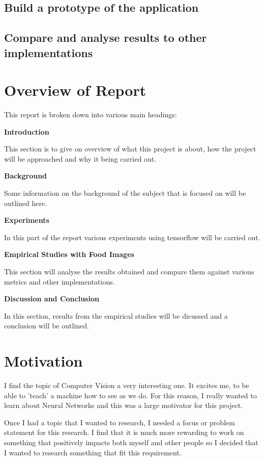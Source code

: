 \subsection*{Build a prototype of the application}

\subsection*{Compare and analyse results to other implementations}


\section{Overview of Report}

This report is broken down into various main headings:

\textbf{Introduction}

This section is to give on overview of what this project is about, how the project will be approached and why it being carried out.

\textbf{Background}

Some information on the background of the subject that is focused on will be outlined here.

\textbf{Experiments}

In this part of the report various experiments using tensorflow will be carried out.

\textbf{Empirical Studies with Food Images}

This section will analyse the results obtained and compare them against various metrics and other implementations.

\textbf{Discussion and Conclusion}

In this section, results from the empirical studies will be dicussed and a conclusion will be outlined.


\section{Motivation}
I find the topic of Computer Vision a very interesting one.
It excites me, to be able to 'teach' a machine how to see as we do.
For this reason, I really wanted to learn about Neural Networks
and this was a large motivator for this project.

Once I had a topic that I wanted to research, I needed a focus or problem statement for this research.
I find that it is much more rewarding to work on something that positively
impacts both myself and other people so I decided that I wanted to research
something that fit this requirement.

